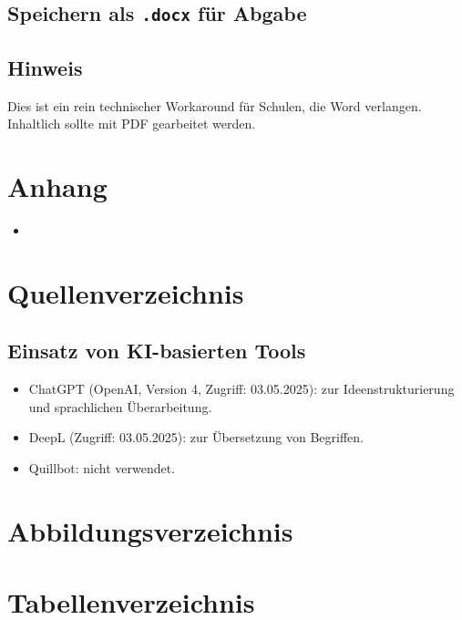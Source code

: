 \subsection{Speichern als \texttt{.docx} für Abgabe}
\subsection*{Hinweis}
Dies ist ein rein technischer Workaround für Schulen, die Word verlangen. Inhaltlich sollte mit PDF gearbeitet werden.



\cleardoublepage
\section{Anhang}

\begin{itemize}
  \item 
\end{itemize}

\cleardoublepage
\section{Quellenverzeichnis}

\printbibliography[heading=none]

\vspace{1cm}

\subsection{Einsatz von KI-basierten Tools}
\begin{itemize}
  \item ChatGPT (OpenAI, Version 4, Zugriff: 03.05.2025): zur Ideenstrukturierung und sprachlichen Überarbeitung.
  \item DeepL (Zugriff: 03.05.2025): zur Übersetzung von Begriffen.
  \item Quillbot: nicht verwendet.
\end{itemize}

\cleardoublepage
\section{Abbildungsverzeichnis}
\listoffigures

\cleardoublepage
\section{Tabellenverzeichnis}
\listoftables


